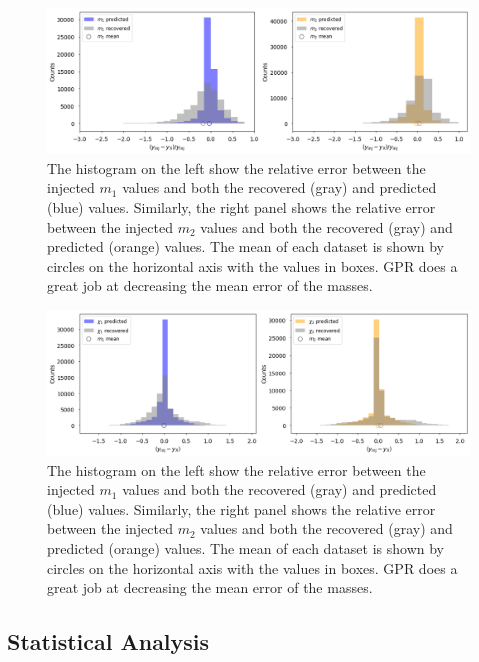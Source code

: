 \documentclass[aps,prd,twocolumn,superscriptaddress,preprintnumbers,floatfix,nofootinbib]{revtex4-2}
\begin{document}
\begin{figure}[!h]
  \centering
  \includegraphics[width=\linewidth]{m1_m2_chi_error_analysis_wboxes.png}
  \caption{The histogram on the left show the relative error between the injected $m_1$ values and 
  		both the recovered (gray) and predicted (blue) values. Similarly, the right panel shows the 
		relative error between the injected $m_2$ values and both the recovered (gray) and 
		predicted (orange) values. The mean of each dataset is shown by circles on the horizontal 
		axis with the values in boxes. GPR does a great job at decreasing the mean error of the masses. }
  \label{m1_m2_chi_error_analysis_wboxes}
\end{figure}

\begin{figure}[!h]
  \centering
  \includegraphics[width=\linewidth]{m_chi1_chi2_error_analysis_wboxes.png}
  \caption{The histogram on the left show the relative error between the injected $m_1$ values and 
  		both the recovered (gray) and predicted (blue) values. Similarly, the right panel shows the 
		relative error between the injected $m_2$ values and both the recovered (gray) and 
		predicted (orange) values. The mean of each dataset is shown by circles on the horizontal 
		axis with the values in boxes. GPR does a great job at decreasing the mean error of the masses. }
  \label{m_chi1_chi2_error_analysis_wboxes}
\end{figure}


\subsection{Statistical Analysis}
%
\end{document}
